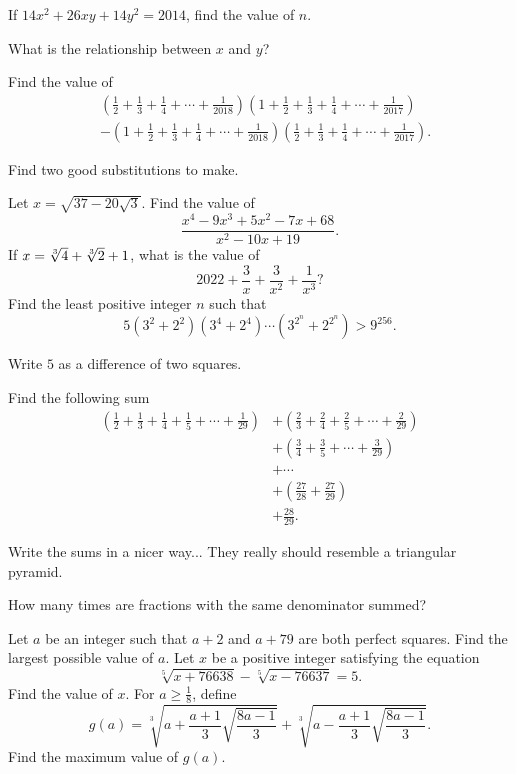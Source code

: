 \documentclass[../jarvis.tex]{subfiles}
\begin{document}
If $14x^2+26xy+14y^2=2014$, find the value of $n$.
\begin{hints}
    \begin{hint}
        What is the relationship between $x$ and $y$?
    \end{hint}
\end{hints}
\problem[2018 SMO(J) P2]Find the value of \begin{align*}
    &\left(\frac{1}{2}+\frac{1}{3}+\frac{1}{4}+\cdots+\frac{1}{2018}\right)\left(1+\frac{1}{2}+\frac{1}{3}+\frac{1}{4}+\cdots+\frac{1}{2017}\right) \\
    &-\left(1+\frac{1}{2}+\frac{1}{3}+\frac{1}{4}+\cdots+\frac{1}{2018}\right)\left(\frac{1}{2}+\frac{1}{3}+\frac{1}{4}+\cdots+\frac{1}{2017}\right).
\end{align*}
\begin{hints}
    \begin{hint}
        Find two good substitutions to make.
    \end{hint}
\end{hints}
\problem[2014 SMO(S) P20]Let $x=\sqrt{37-20\sqrt{3}}$. Find the value of 
$$\frac{x^4-9x^3+5x^2-7x+68}{x^2-10x+19}.$$
\problem[2022 SMO(J) P21]If $x=\sqrt[3]{4}+\sqrt[3]{2}+1$, what is the value of
$$2022+\frac{3}{x}+\frac{3}{x^2}+\frac{1}{x^3}?$$
\problem[2017 SMO(S) P29]Find the least positive integer $n$ such that
$$5(3^2+2^2)(3^4+2^4)\cdots(3^{2^n}+2^{2^n})>9^{256}.$$
\begin{hints}
    \begin{hint}
        Write $5$ as a difference of two squares.
    \end{hint}
\end{hints}
\problem[2014 SMO(J) P30]Find the following sum
\begin{align*}
    \left(\frac{1}{2}+\frac{1}{3}+\frac{1}{4}+\frac{1}{5}+\cdots+\frac{1}{29}\right)&+\left(\frac{2}{3}+\frac{2}{4}+\frac{2}{5}+\cdots+\frac{2}{29}\right) \\
    &+\left(\frac{3}{4}+\frac{3}{5}+\cdots+\frac{3}{29}\right) \\
    &+\cdots \\
    &+\left(\frac{27}{28}+\frac{27}{29}\right) \\
    &+\frac{28}{29}.
\end{align*}
\begin{hints}
    \begin{hint}
        Write the sums in a nicer way... They really should resemble a triangular pyramid.
    \end{hint}
    \begin{hint}
        How many times are fractions with the same denominator summed?
    \end{hint}
\end{hints}
\problem[2017 SMO(J) P24]Let $a$ be an integer such that $a+2$ and $a+79$ are both perfect squares. Find the largest possible value of $a$.
\problem[2021 SMO(J) P25]Let $x$ be a positive integer satisfying the equation
$$\sqrt[5]{x+76638}-\sqrt[5]{x-76637}=5.$$
Find the value of $x$.
\problem[2014 SMO(J) P32]For $a\geq\frac{1}{8}$, define
$$g(a)=\sqrt[3]{a+\frac{a+1}{3}\sqrt{\frac{8a-1}{3}}}+\sqrt[3]{a-\frac{a+1}{3}\sqrt{\frac{8a-1}{3}}}.$$
Find the maximum value of $g(a)$.
\end{document}
